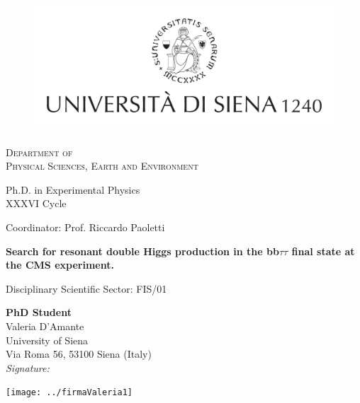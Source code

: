 \begin{titlepage}
%
\begin{figure}[ht]
\centering
\includegraphics[height=50mm]{LOGO_UNISI_ESTESO_SIGILLO_SOPRA_NERO_0.pdf}
\end{figure}
%
\begin{center}
{\scshape \large
Department of \\Physical Sciences, Earth and Environment
}



{\large
Ph.D. in Experimental Physics \\
{ XXXVI Cycle}
}

\vspace{10mm}
{\large
Coordinator: Prof. Riccardo Paoletti
}

\vspace{10mm}

\begin{spacing}{2.0}
{\huge \bf Search for resonant double Higgs production in the bb$\tau\tau$ final state at the CMS experiment.}
\end{spacing}

\vspace{5mm}
{\large
Disciplinary Scientific Sector: FIS/01
}
\end{center}
\vspace{1cm}

\begin{minipage}{0.5\textwidth}
\textbf{PhD Student}\\
Valeria D'Amante\\
University of Siena\\
Via Roma 56, 53100 Siena (Italy)\\

\hspace{4cm} \textit{Signature:}\\
\end{minipage}
\begin{minipage}{0.4\textwidth}
    \vspace{2cm}
    \hspace{-2.5cm}
    \texttt{[image: ../firmaValeria1]}
\end{minipage}




\end{titlepage}
